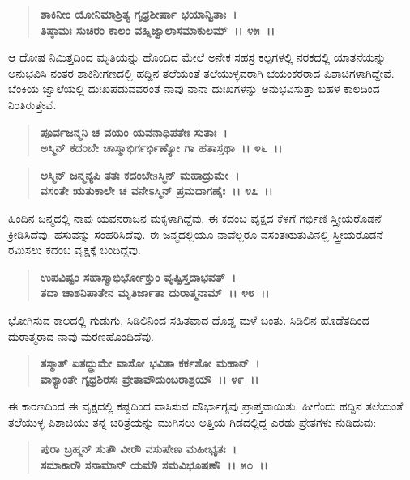 \begin{verse}
\textbf{ಶಾಕಿನೀಂ ಯೋನಿಮಾಶ್ರಿತ್ಯ ಗೃಧ್ರಶೀರ್ಷಾ ಭಯಾನ್ವಿತಾಃ~।}\\\textbf{ತಿಷ್ಠಾಮಃ ಸುಚಿರಂ ಕಾಲಂ ವಹ್ನಿಜ್ವಾಲಾಸಮಾಕುಲಮ್~।। ೪೫~।। }
\end{verse}

ಆ ದೋಷ ನಿಮಿತ್ತದಿಂದ ಮೃತಿಯನ್ನು ಹೊಂದಿದ ಮೇಲೆ ಅನೇಕ ಸಹಸ್ರ ಕಲ್ಪಗಳಲ್ಲಿ ನರಕದಲ್ಲಿ ಯಾತನೆಯನ್ನು ಅನುಭವಿಸಿ ನಂತರ ಶಾಕಿನೀಗಣದಲ್ಲಿ ಹದ್ದಿನ ತಲೆಯಂತೆ ತಲೆಯುಳ್ಳವರಾಗಿ ಭಯಂಕರರಾದ ಪಿಶಾಚಿಗಳಾಗಿದ್ದೇವೆ. ಬೆಂಕಿಯ ಜ್ವಾಲೆಯಲ್ಲಿ ದುಃಖಪಡುವವರಂತೆ ನಾವು ನಾನಾ ದುಃಖಗಳನ್ನು ಅನುಭವಿಸುತ್ತಾ ಬಹಳ ಕಾಲದಿಂದ ನಿಂತಿರುತ್ತೇವೆ.

\begin{verse}
\textbf{ಪೂರ್ವಜನ್ಮನಿ ಚ ವಯಂ ಯವನಾಧಿಪತೇಃ ಸುತಾಃ~।}\\\textbf{ಅಸ್ಮಿನ್ ಕದಂಬೇ ಚಾಸ್ಮಾಭಿರ್ಗರ್ಭಿಣ್ಯೋ ಗಾ ಹತಾಸ್ತಥಾ~।। ೪೬~।। }
\end{verse}

\begin{verse}
\textbf{ಅಸ್ಮಿನ್ ಜನ್ಮನ್ಯಪಿ ತತಃ ಕದಂಬೇsಸ್ಮಿನ್ ಮಹಾದ್ರುಮೇ~।}\\\textbf{ವಸಂತೇ ಋತುಕಾಲೇ ಚ ವನೇಽಸ್ಮಿನ್ ಪ್ರಮದಾಗಣೈಃ~।। ೪೭~।।} 
\end{verse}

ಹಿಂದಿನ ಜನ್ಮದಲ್ಲಿ ನಾವು ಯವನರಾಜನ ಮಕ್ಕಳಾಗಿದ್ದೆವು. ಈ ಕದಂಬ ವೃಕ್ಷದ ಕೆಳಗೆ ಗರ್ಭಿಣಿ ಸ್ತ್ರೀಯರೊಡನೆ ಕ್ರೀಡಿಸಿದೆವು. ಹಸುವನ್ನು ಸಂಹರಿಸಿದೆವು. ಈ ಜನ್ಮದಲ್ಲಿಯೂ ನಾವೆಲ್ಲರೂ ವಸಂತಋತುವಿನಲ್ಲಿ ಸ್ತ್ರೀಯರೊಡನೆ ರಮಿಸಲು ಕದಂಬ ವೃಕ್ಷಕ್ಕೆ ಬಂದಿದ್ದೆವು.

\begin{verse}
\textbf{ಉಪವಿಷ್ಟಂ ಸಹಾಸ್ಮಾಭಿರ್ಭೋಕ್ತುಂ ವೃಷ್ಟಿಸ್ತದಾಭವತ್~।}\\\textbf{ತದಾ ಚಾಶನಿಪಾತೇನ ಮೃತಿರ್ಜಾತಾ ದುರಾತ್ಮನಾಮ್~।। ೪೮~।।} 
\end{verse}

ಭೋಗಿಸುವ ಕಾಲದಲ್ಲಿ ಗುಡುಗು, ಸಿಡಿಲಿನಿಂದ ಸಹಿತವಾದ ದೊಡ್ಡ ಮಳೆ ಬಂತು. ಸಿಡಿಲಿನ ಹೊಡೆತದಿಂದ ದುರಾತ್ಮರಾದ ನಾವು ಮರಣಹೊಂದಿದೆವು.

\begin{verse}
\textbf{ತಸ್ಮಾತ್ ಏತದ್ದ್ರುಮೇ ವಾಸೋ ಭವಿತಾ ಕರ್ಕಶೋ ಮಹಾನ್~।}\\\textbf{ವಾಕ್ಯಾಂತೇ ಗೃಧ್ರಶಿರಸಃ ಪ್ರೇತಾವೌದುಂಬರಾಶ್ರಯೌ~।। ೪೯~।।} 
\end{verse}

ಈ ಕಾರಣದಿಂದ ಈ ವೃಕ್ಷದಲ್ಲಿ ಕಷ್ಟದಿಂದ ವಾಸಿಸುವ ದೌರ್ಭಾಗ್ಯವು ಪ್ರಾಪ್ತವಾಯಿತು. ಹೀಗೆಂದು ಹದ್ದಿನ ತಲೆಯಂತೆ ತಲೆಯುಳ್ಳ ಪಿಶಾಚಿಯು ತನ್ನ ಚರಿತ್ರೆಯನ್ನು ಮುಗಿಸಲು ಅತ್ತಿಯ ಗಿಡದಲ್ಲಿದ್ದ ಎರಡು ಪ್ರೇತಗಳು ನುಡಿದುವು:

\begin{verse}
\textbf{ಪುರಾ ಬ್ರಹ್ಮನ್ ಸುತೌ ವೀರೌ ವಸುಷೇಣ ಮಹೀಭೃತಃ~।}\\\textbf{ಸಮಾಕಾರೌ ಸನಾಮಾನ್ ಯಮೌ ಸಮವಿಭೂಷಣೌ~।। ೫೦~।।} 
\end{verse}

